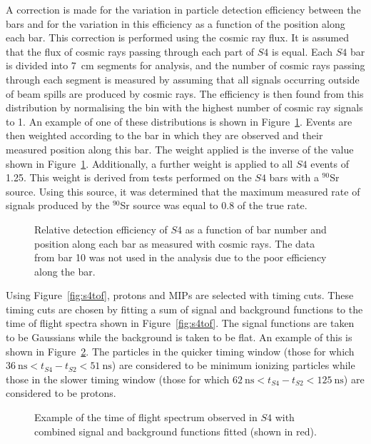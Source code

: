A correction is made for the variation in particle detection efficiency between the bars and for the variation in this efficiency as a function of the position along each bar.
This correction is performed using the cosmic ray flux.
It is assumed that the flux of cosmic rays passing through each part of $\mathit{S4}$ is equal.
Each $\mathit{S4}$ bar is divided into 7~cm segments for analysis, and the number of cosmic rays passing through each segment is measured by assuming that all signals occurring outside of beam spills are produced by cosmic rays.
The efficiency is then found from this distribution by normalising the bin with the highest number of cosmic ray signals to 1.
An example of one of these distributions is shown in Figure~\ref{fig:s4PosEff}.
Events are then weighted according to the bar in which they are observed and their measured position along this bar.
The weight applied is the inverse of the value shown in Figure~\ref{fig:s4PosEff}.
Additionally, a further weight is applied to all $\mathit{S4}$ events of 1.25.
This weight is derived from tests performed on the $\mathit{S4}$ bars with a $^{90}$Sr source.
Using this source, it was determined that the maximum measured rate of signals produced by the $^{90}$Sr source was equal to 0.8 of the true rate.


\begin{figure}
  \begin{adjustbox}{width=.7\textwidth, center}
    
  \end{adjustbox}
  \caption{Relative detection efficiency of $\mathit{S4}$ as a function of bar number and position along each bar as measured with cosmic rays. The data from bar 10 was not used in the analysis due to the poor efficiency along the bar.}
  \label{fig:s4PosEff}
\end{figure}

Using Figure~\ref{fig:s4tof}, protons and MIPs are selected with timing cuts. 
These timing cuts are chosen by fitting a sum of signal and background functions to the time of flight spectra shown in Figure~\ref{fig:s4tof}. 
The signal functions are taken to be Gaussians while the background is taken to be flat. 
An example of this is shown in Figure~\ref{fig:fitEx}.
The particles in the quicker timing window (those for which $36~\text{ns}<t_{\mathit{S4}}-t_{\mathit{S2}}<51~\text{ns}$) are considered to be minimum ionizing particles while those in the slower timing window (those for which $62~\text{ns}<t_{\mathit{S4}}-t_{\mathit{S2}}<125~\text{ns}$) are considered to be protons.

\begin{figure}[ht]
  \begin{adjustbox}{max totalsize={\textwidth}{.62\textheight},center}
    
  \end{adjustbox}
  \caption{Example of the time of flight spectrum observed in $\mathit{S4}$ with combined signal and background functions fitted (shown in red).}
  \label{fig:fitEx}
\end{figure}



